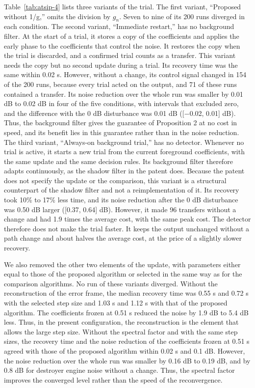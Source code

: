\documentclass[sip,biber]{now-journal}
\begin{document}
Table~\ref{tab:atsip-4} lists three variants of the trial. The first variant, ``Proposed without 1/g,'' omits the division by \(g_n\). Seven to nine of its 200 runs diverged in each condition. The second variant, ``Immediate restart,'' has no background filter. At the start of a trial, it stores a copy of the coefficients and applies the early phase to the coefficients that control the noise. It restores the copy when the trial is discarded, and a confirmed trial counts as a transfer. This variant needs the copy but no second update during a trial. Its recovery time was the same within 0.02 s. However, without a change, its control signal changed in 154 of the 200 runs, because every trial acted on the output, and 71 of these runs contained a transfer. Its noise reduction over the whole run was smaller by 0.01 dB to 0.02 dB in four of the five conditions, with intervals that excluded zero, and the difference with the 0 dB disturbance was 0.01 dB ({[}−0.02, 0.01{]} dB). Thus, the background filter gives the guarantee of Proposition 2 at no cost in speed, and its benefit lies in this guarantee rather than in the noise reduction. The third variant, ``Always-on background trial,'' has no detector. Whenever no trial is active, it starts a new trial from the current foreground coefficients, with the same update and the same decision rules. Its background filter therefore adapts continuously, as the shadow filter in the patent \cite{harman2022} does. Because the patent does not specify the update or the comparison, this variant is a structural counterpart of the shadow filter and not a reimplementation of it. Its recovery took 10\% to 17\% less time, and its noise reduction after the 0 dB disturbance was 0.50 dB larger ({[}0.37, 0.64{]} dB). However, it made 96 transfers without a change and had 1.9 times the average cost, with the same peak cost. The detector therefore does not make the trial faster. It keeps the output unchanged without a path change and about halves the average cost, at the price of a slightly slower recovery.

We also removed the other two elements of the update, with parameters either equal to those of the proposed algorithm or selected in the same way as for the comparison algorithms. No run of these variants diverged. Without the reconstruction of the error frame, the median recovery time was 0.55 s and 0.72 s with the selected step size and 1.03 s and 1.12 s with that of the proposed algorithm. The coefficients frozen at 0.51 s reduced the noise by 1.9 dB to 5.4 dB less. Thus, in the present configuration, the reconstruction is the element that allows the large step size. Without the spectral factor and with the same step sizes, the recovery time and the noise reduction of the coefficients frozen at 0.51 s agreed with those of the proposed algorithm within 0.02 s and 0.1 dB. However, the noise reduction over the whole run was smaller by 0.16 dB to 0.19 dB, and by 0.8 dB for destroyer engine noise without a change. Thus, the spectral factor improves the converged level rather than the speed of the reconvergence.
\end{document}

